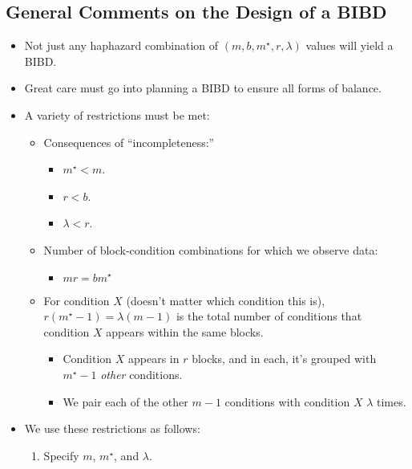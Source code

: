 \subsection{General Comments on the Design of a BIBD}
\begin{itemize}
    \item Not just any haphazard combination of $ (m,b,m^\star,r,\lambda) $ values will yield a BIBD\@.
    \item Great care must go into planning a BIBD to ensure all forms of balance.
    \item A variety of restrictions must be met:
          \begin{itemize}
              \item Consequences of ``incompleteness:''
                    \begin{itemize}
                        \item $ m^\star<m $.
                        \item $ r<b $.
                        \item $ \lambda<r $.
                    \end{itemize}
              \item Number of block-condition combinations for which we observe data:
                    \begin{itemize}
                        \item $ mr=bm^\star $
                    \end{itemize}
              \item For condition $ X $ (doesn't matter which condition this is), $ r(m^\star-1)=\lambda(m-1) $ is the
                    total number of conditions that condition $ X $ appears within the same blocks.
                    \begin{itemize}
                        \item Condition $ X $ appears in $ r $ blocks, and in each, it's grouped with $ m^\star-1 $ \emph{other} conditions.
                        \item We pair each of the other $ m-1 $ conditions with condition $ X $ $ \lambda $ times.
                    \end{itemize}
          \end{itemize}
    \item We use these restrictions as follows:
          \begin{enumerate}
              \item Specify $ m $, $ m^\star $, and $ \lambda $.

\end{enumerate}
\end{itemize}
